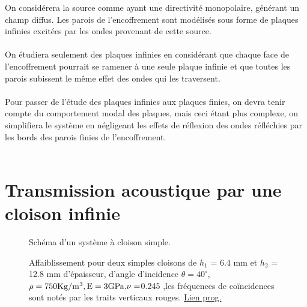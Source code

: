 \documentclass[12pt,foolscap]{report}
\begin{document}
	On considérera la source comme ayant une directivité monopolaire, générant un champ diffus. Les parois de l'encoffrement sont modélisés sous forme de plaques infinies excitées par les ondes provenant de cette source. \\ \\
	On étudiera seulement des plaques infinies en considérant que chaque face de l'encoffrement pourrait se ramener à une seule plaque infinie et que toutes les parois subissent le même effet des ondes qui les traversent. \\ \\
	Pour passer de l'étude des plaques infinies aux plaques finies, on devra tenir compte du comportement modal des plaques, mais ceci étant plus complexe, on simplifiera le système en négligeant les effets de réflexion des ondes réfléchies par les bords des parois finies de l'encoffrement.\\ \\
	
	
	\section{Transmission acoustique par une cloison infinie}
	\begin{figure}[h!]	
		\centering
		\begin{minipage}[c]{.45\linewidth}
			\begin{center}
				\caption{ Schéma d'un système à cloison simple.}
				\label{simplecloison}
			\end{center}
		\end{minipage}
		\hfill
		\begin{minipage}[c]{.45\linewidth}
			\begin{center}
				\centering
				\caption{ Affaiblissement pour deux simples cloisons de $h_1$ = 6.4 mm et $h_{2}$ = 12.8 mm d'épaisseur, d'angle d'incidence $\theta  = 40^\circ $, $\rho  = 750 {\rm{Kg/}}{{\rm{m}}^3},{\rm{E = 3}}{\rm{GPa, }} \nu = $0.245 ,les fréquences de coïncidences sont notés par les traits verticaux rouges. \href{https://github.com/Nuopel/Encoffrement/blob/master/Programme/comparaison_cloison.m}{Lien prog.}}
				\label{simplecloin1}
			\end{center}
		\end{minipage}
	\end{figure}
	
\end{document}

